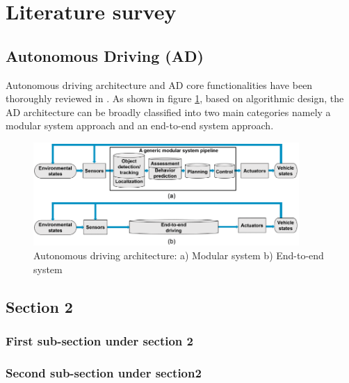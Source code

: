 \section{Literature survey}\label{chap:chap_2}

\subsection{Autonomous Driving (AD)}\label{sec:subsec_2.1}
Autonomous driving architecture and AD core functionalities have been thoroughly reviewed in \cite{ad_pipeline}. As shown in figure \ref{fig:ad_architercture}, based on algorithmic design, the AD architecture can be broadly classified into two main categories namely a modular system approach and an end-to-end system approach. 

\begin{figure}[!h]
	\centering
	\includegraphics[width={0.9\textwidth}]{images/AD_architecture.png}
	\caption{Autonomous driving architecture: a) Modular system b) End-to-end system \cite{ad_pipeline}}
	\label{fig:ad_architercture}	
\end{figure}

\subsection{Section 2}\label{sec:subsec_2.2}


\subsubsection{First sub-section under section 2}\label{ssec:subsubsec_2.2.1}



\subsubsection{Second sub-section under section2}\label{ssec:subsubsec_2.2.2}


